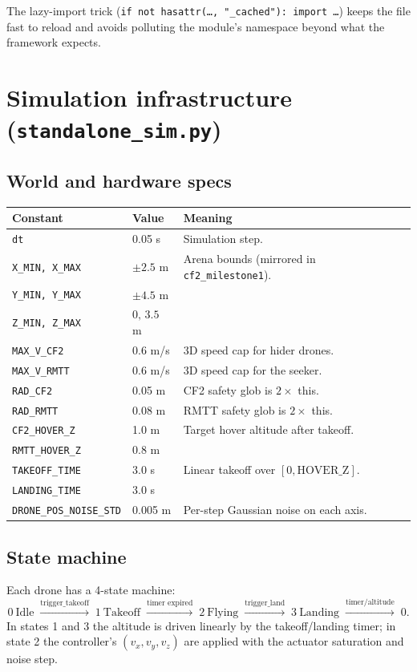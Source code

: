 \documentclass[11pt,a4paper]{article}
\newcommand{\code}[1]{\texttt{#1}}
\begin{document}
The lazy-import trick (\code{if not hasattr(\dots, "\_cached"): import \dots})
keeps the file fast to reload and avoids polluting the module's namespace
beyond what the framework expects.

\section{Simulation infrastructure (\code{standalone\_sim.py})}

\subsection{World and hardware specs}
\begin{longtable}{p{4.5cm}p{2.2cm}p{8cm}}
\toprule
\textbf{Constant} & \textbf{Value} & \textbf{Meaning} \\
\midrule
\code{dt} & 0.05 s & Simulation step. \\
\code{X\_MIN, X\_MAX} & $\pm 2.5$ m & Arena bounds (mirrored in
\code{cf2\_milestone1}). \\
\code{Y\_MIN, Y\_MAX} & $\pm 4.5$ m & \\
\code{Z\_MIN, Z\_MAX} & $0,\,3.5$ m & \\
\code{MAX\_V\_CF2} & 0.6 m/s & 3D speed cap for hider drones. \\
\code{MAX\_V\_RMTT} & 0.6 m/s & 3D speed cap for the seeker. \\
\code{RAD\_CF2} & 0.05 m & CF2 safety glob is $2 \times$ this. \\
\code{RAD\_RMTT} & 0.08 m & RMTT safety glob is $2 \times$ this. \\
\code{CF2\_HOVER\_Z} & 1.0 m & Target hover altitude after takeoff. \\
\code{RMTT\_HOVER\_Z} & 0.8 m & \\
\code{TAKEOFF\_TIME} & 3.0 s & Linear takeoff over $[0, \text{HOVER\_Z}]$. \\
\code{LANDING\_TIME} & 3.0 s & \\
\code{DRONE\_POS\_NOISE\_STD} & 0.005 m & Per-step Gaussian noise on each axis. \\
\bottomrule
\end{longtable}

\subsection{State machine}
Each drone has a 4-state machine:
\[
    0\ \text{Idle} \;\xrightarrow{\text{trigger\_takeoff}}\;
    1\ \text{Takeoff} \;\xrightarrow{\text{timer expired}}\;
    2\ \text{Flying} \;\xrightarrow{\text{trigger\_land}}\;
    3\ \text{Landing} \;\xrightarrow{\text{timer/altitude}}\; 0.
\]
In states 1 and 3 the altitude is driven linearly by the takeoff/landing
timer; in state 2 the controller's $(v_x, v_y, v_z)$ are applied with the
actuator saturation and noise step.
\end{document}
